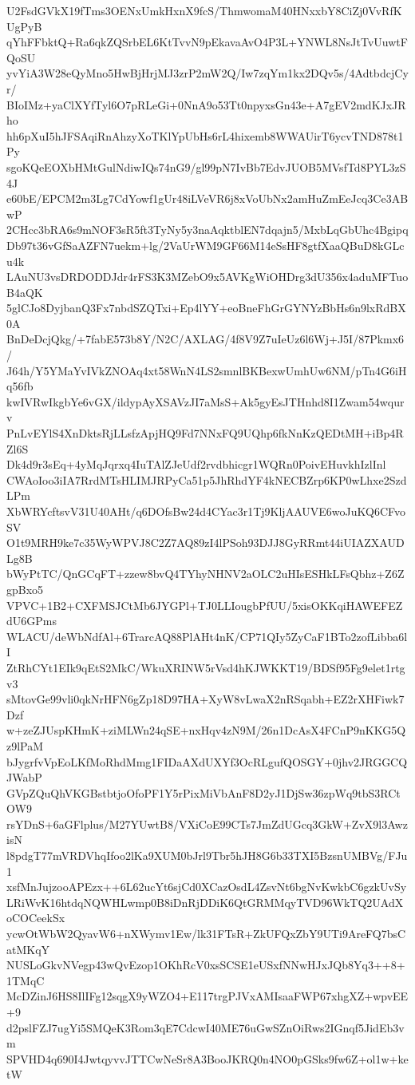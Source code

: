 U2FsdGVkX19fTms3OENxUmkHxnX9fcS/ThmwomaM40HNxxbY8CiZj0VvRfKUgPyB
qYhFFbktQ+Ra6qkZQSrbEL6KtTvvN9pEkavaAvO4P3L+YNWL8NsJtTvUuwtFQoSU
yvYiA3W28eQyMno5HwBjHrjMJ3zrP2mW2Q/Iw7zqYm1kx2DQv5s/4AdtbdcjCyr/
BIoIMz+yaClXYfTyl6O7pRLeGi+0NnA9o53Tt0npyxsGn43e+A7gEV2mdKJxJRho
hh6pXuI5hJFSAqiRnAhzyXoTKlYpUbHs6rL4hixemb8WWAUirT6ycvTND878t1Py
sgoKQeEOXbHMtGulNdiwIQs74nG9/gl99pN7IvBb7EdvJUOB5MVsfTd8PYL3zS4J
e60bE/EPCM2m3Lg7CdYowf1gUr48iLVeVR6j8xVoUbNx2amHuZmEeJcq3Ce3ABwP
2CHcc3bRA6s9mNOF3sR5ft3TyNy5y3naAqktblEN7dqajn5/MxbLqGbUhc4Bgipq
Db97t36vGfSaAZFN7uekm+lg/2VaUrWM9GF66M14eSsHF8gtfXaaQBuD8kGLcu4k
LAuNU3vsDRDODDJdr4rFS3K3MZebO9x5AVKgWiOHDrg3dU356x4aduMFTuoB4aQK
5glCJo8DyjbanQ3Fx7nbdSZQTxi+Ep4lYY+eoBneFhGrGYNYzBbHs6n9lxRdBX0A
BnDeDcjQkg/+7fabE573b8Y/N2C/AXLAG/4f8V9Z7uIeUz6l6Wj+J5I/87Pkmx6/
J64h/Y5YMaYvIVkZNOAq4xt58WnN4LS2smnlBKBexwUmhUw6NM/pTn4G6iHq56fb
kwIVRwIkgbYe6vGX/ildypAyXSAVzJI7aMsS+Ak5gyEsJTHnhd8I1Zwam54wqurv
PnLvEYlS4XnDktsRjLLsfzApjHQ9Fd7NNxFQ9UQhp6fkNnKzQEDtMH+iBp4RZl6S
Dk4d9r3sEq+4yMqJqrxq4IuTAlZJeUdf2rvdbhicgr1WQRn0PoivEHuvkhIzlInl
CWAoIoo3iIA7RrdMTsHLIMJRPyCa51p5JhRhdYF4kNECBZrp6KP0wLhxe2SzdLPm
XbWRYcftsvV31U40AHt/q6DOfsBw24d4CYac3r1Tj9KljAAUVE6woJuKQ6CFvoSV
O1t9MRH9ke7c35WyWPVJ8C2Z7AQ89zI4lPSoh93DJJ8GyRRmt44iUIAZXAUDLg8B
bWyPtTC/QnGCqFT+zzew8bvQ4TYhyNHNV2aOLC2uHIsESHkLFsQbhz+Z6ZgpBxo5
VPVC+1B2+CXFMSJCtMb6JYGPl+TJ0LLIougbPfUU/5xisOKKqiHAWEFEZdU6GPms
WLACU/deWbNdfAl+6TrarcAQ88PlAHt4nK/CP71QIy5ZyCaF1BTo2zofLibba6lI
ZtRhCYt1EIk9qEtS2MkC/WkuXRINW5rVsd4hKJWKKT19/BDSf95Fg9elet1rtgv3
sMtovGe99vli0qkNrHFN6gZp18D97HA+XyW8vLwaX2nRSqabh+EZ2rXHFiwk7Dzf
w+zeZJUspKHmK+ziMLWn24qSE+nxHqv4zN9M/26n1DcAsX4FCnP9nKKG5Qz9lPaM
bJygrfvVpEoLKfMoRhdMmg1FIDaAXdUXYf3OcRLgufQOSGY+0jhv2JRGGCQJWabP
GVpZQuQhVKGBstbtjoOfoPF1Y5rPixMiVbAnF8D2yJ1DjSw36zpWq9tbS3RCtOW9
rsYDnS+6aGFlplus/M27YUwtB8/VXiCoE99CTs7JmZdUGcq3GkW+ZvX9l3AwzisN
l8pdgT77mVRDVhqIfoo2lKa9XUM0bJrl9Tbr5hJH8G6b33TXI5BzsnUMBVg/FJu1
xsfMnJujzooAPEzx++6L62ucYt6sjCd0XCazOsdL4ZsvNt6bgNvKwkbC6gzkUvSy
LRiWvK16htdqNQWHLwmp0B8iDnRjDDiK6QtGRMMqyTVD96WkTQ2UAdXoCOCeekSx
ycwOtWbW2QyavW6+nXWymv1Ew/lk31FTsR+ZkUFQxZbY9UTi9AreFQ7bsCatMKqY
NUSLoGkvNVegp43wQvEzop1OKhRcV0xsSCSE1eUSxfNNwHJxJQb8Yq3++8+1TMqC
McDZinJ6HS8IlIFg12sqgX9yWZO4+E117trgPJVxAMIsaaFWP67xhgXZ+wpvEE+9
d2pslFZJ7ugYi5SMQeK3Rom3qE7CdcwI40ME76uGwSZnOiRws2IGnqf5JidEb3vm
SPVHD4q690I4JwtqyvvJTTCwNeSr8A3BooJKRQ0n4NO0pGSks9fw6Z+ol1w+ketW
